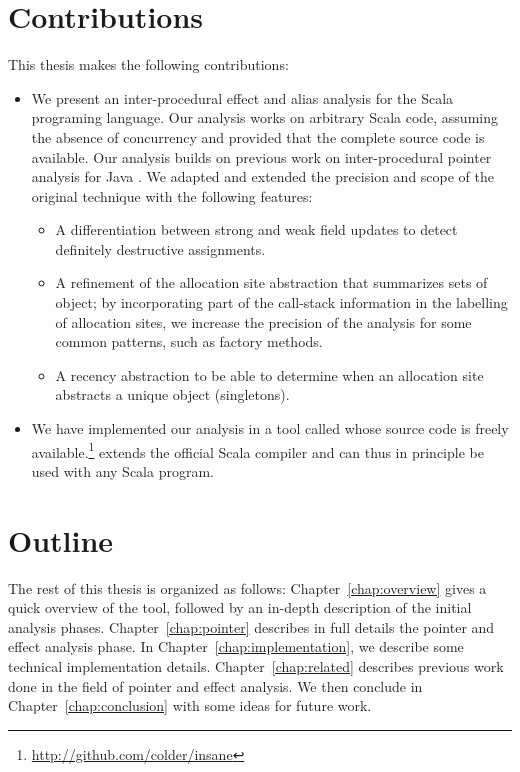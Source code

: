 \section{Contributions}
This thesis makes the following contributions:
\begin{itemize}
    \item
    We present an inter-procedural effect and alias analysis for the Scala
programing language. Our analysis works on arbitrary Scala code, assuming the
absence of concurrency and provided that the complete source code is available.
Our analysis builds on previous work on inter-procedural pointer analysis for
Java \cite{Salcianu2006}. 
We adapted and extended the precision and scope of the original technique with the following features:
    \begin{itemize}
        \item A differentiation between strong and weak field updates to detect
definitely destructive assignments.
        \item A refinement of the allocation
site abstraction that summarizes sets of object;
by incorporating part of the call-stack information in the labelling of
allocation sites, we increase the precision of the analysis for some common
patterns, such as factory methods.
        \item A recency abstraction to be able to determine when an allocation
site abstracts a unique object (singletons).
    \end{itemize}

    \item We have implemented our analysis in a tool called {\insane} whose
source code is freely
available.\footnote{\url{http://github.com/colder/insane}} {\insane} extends
the official Scala compiler and can thus in principle be used with any Scala
program.
\end{itemize}

\section{Outline}
The rest of this thesis is organized as follows: Chapter~\ref{chap:overview}
gives a quick overview of the tool, followed by an in-depth description of the
initial analysis phases. Chapter~\ref{chap:pointer} describes in full details
the pointer and effect analysis phase. In Chapter~\ref{chap:implementation},
we describe some technical implementation details. Chapter~\ref{chap:related}
describes previous work done in the field of pointer and effect analysis. We
then conclude in Chapter~\ref{chap:conclusion} with some ideas for future work.
